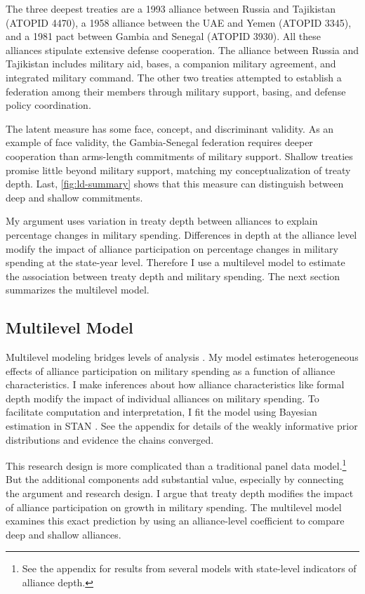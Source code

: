 \documentclass[12pt]{article}
\begin{document}
The three deepest treaties are a 1993 alliance between Russia and Tajikistan (ATOPID 4470), a 1958 alliance between the UAE and Yemen (ATOPID 3345), and a 1981 pact between Gambia and Senegal (ATOPID 3930). 
All these alliances stipulate extensive defense cooperation. 
The alliance between Russia and Tajikistan includes military aid, bases, a companion military agreement, and integrated military command. 
The other two treaties attempted to establish a federation among their members through military support, basing, and defense policy coordination. 


The latent measure has some face, concept, and discriminant validity. 
As an example of face validity, the Gambia-Senegal federation requires deeper cooperation than arms-length commitments of military support. 
Shallow treaties promise little beyond military support, matching my conceptualization of treaty depth. 
Last, \autoref{fig:ld-summary} shows that this measure can distinguish between deep and shallow commitments. 


My argument uses variation in treaty depth between alliances to explain percentage changes in military spending.
Differences in depth at the alliance level modify the impact of alliance participation on percentage changes in military spending at the state-year level. 
Therefore I use a multilevel model to estimate the association between treaty depth and military spending.  
The next section summarizes the multilevel model. 


\subsection*{Multilevel Model} 


Multilevel modeling bridges levels of analysis \citep{SteenbergenJones2002, GelmanHill2007}. 
My model estimates heterogeneous effects of alliance participation on military spending as a function of alliance characteristics. 
I make inferences about how alliance characteristics like formal depth modify the impact of individual alliances on military spending. 
To facilitate computation and interpretation, I fit the model using Bayesian estimation in STAN \citep{Carpenteretal2016}. 
See the appendix for details of the weakly informative prior distributions and evidence the chains converged.


This research design is more complicated than a traditional panel data model.\footnote{See the appendix for results from several models with state-level indicators of alliance depth.}
But the additional components add substantial value, especially by connecting the argument and research design.
I argue that treaty depth modifies the impact of alliance participation on growth in military spending. 
The multilevel model examines this exact prediction by using an alliance-level coefficient to compare deep and shallow alliances. 
\end{document}
